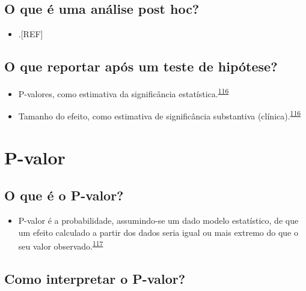 \documentclass[
  a4paper,
]{book}
\providecommand{\tightlist}{%
  \setlength{\itemsep}{0pt}\setlength{\parskip}{0pt}}
\begin{document}
\hypertarget{o-que-uxe9-uma-anuxe1lise-post-hoc}{%
\subsection{O que é uma análise post hoc?}\label{o-que-uxe9-uma-anuxe1lise-post-hoc}}

\begin{itemize}
\tightlist
\item
  .{[}REF{]}
\end{itemize}

\hypertarget{o-que-reportar-apuxf3s-um-teste-de-hipuxf3tese}{%
\subsection{O que reportar após um teste de hipótese?}\label{o-que-reportar-apuxf3s-um-teste-de-hipuxf3tese}}

\begin{itemize}
\item
  P-valores, como estimativa da significância estatística.\textsuperscript{\protect\hyperlink{ref-Sullivan2012}{116}}
\item
  Tamanho do efeito, como estimativa de significância substantiva (clínica).\textsuperscript{\protect\hyperlink{ref-Sullivan2012}{116}}
\end{itemize}

\hypertarget{p-valor}{%
\section{P-valor}\label{p-valor}}

\hypertarget{o-que-uxe9-o-p-valor}{%
\subsection{O que é o P-valor?}\label{o-que-uxe9-o-p-valor}}

\begin{itemize}
\tightlist
\item
  P-valor é a probabilidade, assumindo-se um dado modelo estatístico, de que um efeito calculado a partir dos dados seria igual ou mais extremo do que o seu valor observado.\textsuperscript{\protect\hyperlink{ref-wasserstein2016}{117}}
\end{itemize}

\hypertarget{como-interpretar-o-p-valor}{%
\subsection{Como interpretar o P-valor?}\label{como-interpretar-o-p-valor}}
\end{document}
